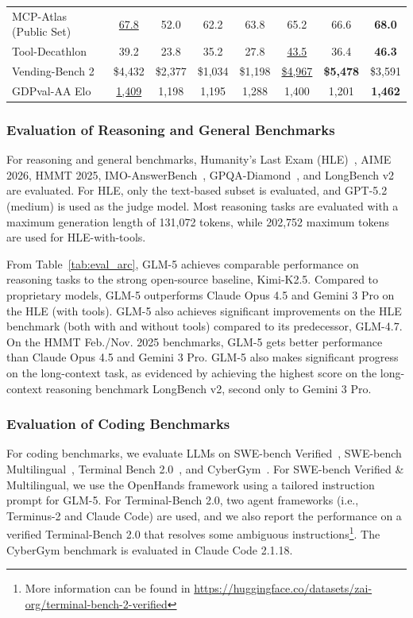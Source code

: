\documentclass{article}
\theoremstyle{definition}
\begin{document}
\begin{table}[htbp]
\begin{tabular}{lccccccc}
MCP-Atlas (Public Set) & \underline{67.8} & 52.0 & 62.2 & 63.8 & 65.2 & 66.6 & \textbf{68.0} \\
Tool-Decathlon & 39.2 & 23.8 & 35.2 & 27.8 & \underline{43.5} & 36.4 & \textbf{46.3} \\
Vending-Bench 2 & \$4,432 & \$2,377 & \$1,034 & \$1,198 & \underline{\$4,967} & \textbf{\$5,478} & \$3,591 \\
GDPval-AA Elo & \underline{1,409} & 1,198 & 1,195 & 1,288 & 1,400 & 1,201 & \textbf{1,462} \\
\bottomrule
\end{tabular}
\end{table}

\subsubsection{Evaluation of Reasoning and General Benchmarks}

For reasoning and general benchmarks, 
Humanity’s Last Exam (HLE)~\cite{phan2025humanity}, AIME 2026, HMMT 2025, IMO-AnswerBench~\cite{luong2025towards},  GPQA-Diamond~\cite{rein2024gpqa}, and LongBench v2~\cite{bai-etal-2025-longbench} are evaluated. 
For HLE, only the text-based subset is evaluated, and GPT-5.2 (medium) is used as the judge model. Most reasoning tasks are evaluated with a maximum generation length of 131,072 tokens, while 202,752 maximum tokens are used for HLE-with-tools. 

From Table~\ref{tab:eval_arc}, GLM-5 achieves comparable performance on reasoning tasks to the strong open-source baseline, Kimi-K2.5.  
Compared to proprietary models, GLM-5 outperforms Claude Opus 4.5 and Gemini 3 Pro on the HLE (with tools). 
GLM-5 also achieves significant improvements on the HLE benchmark (both with and without tools) compared to its predecessor, GLM-4.7. 
On the HMMT Feb./Nov. 2025 benchmarks, GLM-5 gets better performance than Claude Opus 4.5 and Gemini 3 Pro. 
GLM-5 also makes significant progress on the long-context task, as evidenced by achieving the highest score on the long-context reasoning benchmark LongBench v2, second only to Gemini 3 Pro.

\subsubsection{Evaluation of Coding Benchmarks}

For coding benchmarks, we evaluate LLMs on SWE-bench Verified~\cite{jimenez2023swe}, SWE-bench Multilingual~\cite{yang2025swemulti}, Terminal Bench 2.0~\cite{tbench_2025}, and CyberGym~\cite{wang2025cybergym}. 
For SWE-bench Verified \& Multilingual, we use the OpenHands framework using a tailored instruction prompt for GLM-5. 
For Terminal-Bench 2.0, two agent frameworks (i.e., Terminus-2 and Claude Code) are used, and we also report the performance on a verified Terminal-Bench 2.0 that resolves some ambiguous instructions\footnote{More information can be found in \url{https://huggingface.co/datasets/zai-org/terminal-bench-2-verified}}. 
The CyberGym benchmark is evaluated in Claude Code 2.1.18.
\end{document}

